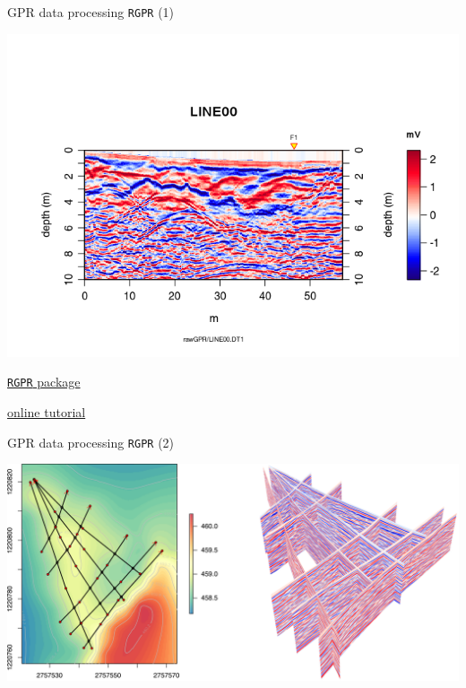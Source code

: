\documentclass[8pt,ignorenonframetext,]{beamer}
\begin{document}
\begin{frame}[fragile]{GPR data processing \texttt{RGPR} (1)}

\includegraphics{imgPres/GPR_processing02.png}

\href{https://github.com/emanuelhuber/RGPR}{\texttt{RGPR} package}

\href{http://emanuelhuber.github.io/RGPR/}{online tutorial}

\end{frame}

\begin{frame}{GPR data processing \texttt{RGPR} (2)}

\includegraphics{imgPres/GPR_processing01.png}

\end{frame}
\end{document}
